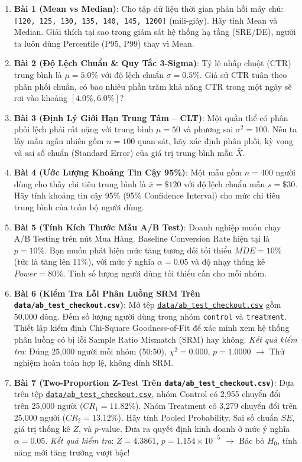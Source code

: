 \begin{baitapbox}
\begin{enumerate}
    \item \textbf{Bài 1 (Mean vs Median)}: Cho tập dữ liệu thời gian phản hồi máy chủ: \texttt{[120, 125, 130, 135, 140, 145, 1200]} (mili-giây). Hãy tính Mean và Median. Giải thích tại sao trong giám sát hệ thống hạ tầng (SRE/DE), người ta luôn dùng Percentile (P95, P99) thay vì Mean.
    \item \textbf{Bài 2 (Độ Lệch Chuẩn \& Quy Tắc 3-Sigma)}: Tỷ lệ nhấp chuột (CTR) trung bình là $\mu = 5.0\%$ với độ lệch chuẩn $\sigma = 0.5\%$. Giả sử CTR tuân theo phân phối chuẩn, có bao nhiêu phần trăm khả năng CTR trong một ngày sẽ rơi vào khoảng $[4.0\%, 6.0\%]$?
    \item \textbf{Bài 3 (Định Lý Giới Hạn Trung Tâm -- CLT)}: Một quần thể có phân phối lệch phải rất nặng với trung bình $\mu = 50$ và phương sai $\sigma^2 = 100$. Nếu ta lấy mẫu ngẫu nhiên gồm $n = 100$ quan sát, hãy xác định phân phối, kỳ vọng và sai số chuẩn (Standard Error) của giá trị trung bình mẫu $\bar{X}$.
    \item \textbf{Bài 4 (Ước Lượng Khoảng Tin Cậy 95\%)}: Một mẫu gồm $n = 400$ người dùng cho thấy chi tiêu trung bình là $\bar{x} = \$120$ với độ lệch chuẩn mẫu $s = \$30$. Hãy tính khoảng tin cậy 95\% (95\% Confidence Interval) cho mức chi tiêu trung bình của toàn bộ người dùng.
    \item \textbf{Bài 5 (Tính Kích Thước Mẫu A/B Test)}: Doanh nghiệp muốn chạy A/B Testing trên nút Mua Hàng. Baseline Conversion Rate hiện tại là $p = 10\%$. Bạn muốn phát hiện mức tăng tương đối tối thiểu $MDE = 10\%$ (tức là tăng lên $11\%$), với mức ý nghĩa $\alpha = 0.05$ và độ nhạy thống kê $Power = 80\%$. Tính số lượng người dùng tối thiểu cần cho mỗi nhóm.
    \item \textbf{Bài 6 (Kiểm Tra Lỗi Phân Luồng SRM Trên \texttt{data/ab\_test\_checkout.csv})}: Mở tệp \href{run:./data/ab_test_checkout.csv}{\texttt{data/ab\_test\_checkout.csv}} gồm 50,000 dòng. Đếm số lượng người dùng trong nhóm \texttt{control} và \texttt{treatment}. Thiết lập kiểm định Chi-Square Goodness-of-Fit để xác minh xem hệ thống phân luồng có bị lỗi Sample Ratio Mismatch (SRM) hay không. \textit{Kết quả kiểm tra}: Đúng 25,000 người mỗi nhóm (50:50), $\chi^2 = 0.000$, $p = 1.0000$ $\rightarrow$ Thử nghiệm hoàn toàn hợp lệ, không dính SRM.
    \item \textbf{Bài 7 (Two-Proportion Z-Test Trên \texttt{data/ab\_test\_checkout.csv})}: Dựa trên tệp \href{run:./data/ab_test_checkout.csv}{\texttt{data/ab\_test\_checkout.csv}}, nhóm Control có 2,955 chuyển đổi trên 25,000 người ($CR_1 = 11.82\%$). Nhóm Treatment có 3,279 chuyển đổi trên 25,000 người ($CR_2 = 13.12\%$). Hãy tính Pooled Probability, Sai số chuẩn $SE$, giá trị thống kê $Z$, và $p$-value. Đưa ra quyết định kinh doanh ở mức ý nghĩa $\alpha = 0.05$. \textit{Kết quả kiểm tra}: $Z = 4.3861$, $p = 1.154 \times 10^{-5}$ $\rightarrow$ Bác bỏ $H_0$, tính năng mới tăng trưởng vượt bậc!

\end{enumerate}
\end{baitapbox}
